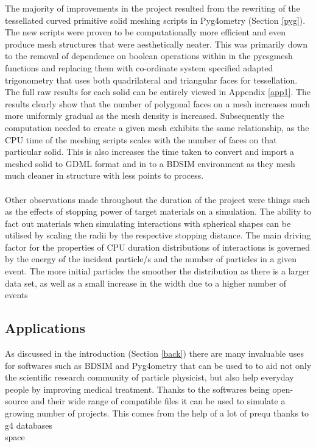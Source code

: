 \documentclass[12pt,a4paper]{article}
\begin{document}
The majority of improvements in the project resulted from the rewriting of the tessellated curved primitive solid meshing scripts in Pyg4ometry (Section \ref{pyg}). The new scripts were proven to be computationally more efficient and even produce mesh structures that were aesthetically neater. This was primarily down to the removal of dependence on boolean operations within in the pycsgmesh functions and replacing them with co-ordinate system specified adapted trigonometry that uses both quadrilateral and triangular faces for tessellation. The full raw results for each solid can be entirely viewed in Appendix \ref{app1}. The results clearly show that the number of polygonal faces on a mesh increases much more uniformly gradual as the mesh density is increased. Subsequently the computation needed to create a given mesh exhibits the same relationship, as the CPU time of the meshing scripts scales with the number of faces on that particular solid. This is also increases the time taken to convert and import a meshed solid to GDML format and in to a BDSIM environment as they mesh much cleaner in structure with less points to process. 
\\\\
Other observations made throughout the duration of the project were things such as the effects of stopping power of target materials on a simulation. The ability to fact out materials when simulating interactions with spherical shapes can be utilised by scaling the radii by the respective stopping distance. The main driving factor for the properties of CPU duration distributions of interactions is governed by the energy of the incident particle/s and the number of particles in a given event. The more initial particles the smoother the distribution as there is a larger data set, as well as a small increase in the width due to a higher number of events 

\subsection{Applications}
As discussed in the introduction (Section \ref{back}) there are many invaluable uses for softwares such as BDSIM and Pyg4ometry that can be used to to aid not only the scientific research community of particle physicist, but also help everyday people by improving medical treatment. Thanks to the softwares being open-source and their wide range of compatible files it can be used to simulate a growing number of projects. This comes from the help of a lot of prequ
thanks to g4 databases\\
space\\
\end{document}
